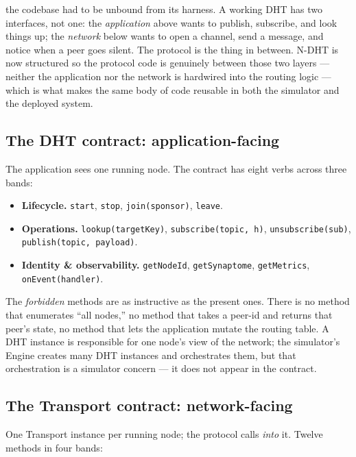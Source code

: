 \documentclass[twoside,nobib]{tufte-book}
\newcommand{\NDHT}{N-DHT\xspace}
\begin{document}
 the codebase had to
be unbound from its harness. A working DHT has two interfaces,
not one: the \emph{application} above wants to publish,
subscribe, and look things up; the \emph{network} below wants to
open a channel, send a message, and notice when a peer goes
silent. The protocol is the thing in between. \NDHT is now
structured so the protocol code is genuinely between those two
layers --- neither the application nor the network is hardwired
into the routing logic --- which is what makes the same body of
code reusable in both the simulator and the deployed system.

\subsection{The DHT contract: application-facing}

The application sees one running node. The contract has eight
verbs across three bands:

\begin{itemize}\itemsep2pt
\item \textbf{Lifecycle.} \texttt{start}, \texttt{stop},
  \texttt{join(sponsor)}, \texttt{leave}.
\item \textbf{Operations.} \texttt{lookup(targetKey)},
  \texttt{subscribe(topic, h)}, \texttt{unsubscribe(sub)},
  \texttt{publish(topic, payload)}.
\item \textbf{Identity \& observability.} \texttt{getNodeId},
  \texttt{getSynaptome}, \texttt{getMetrics},
  \texttt{onEvent(handler)}.
\end{itemize}

The \emph{forbidden} methods are as instructive as the present
ones. There is no method that enumerates ``all nodes,'' no
method that takes a peer-id and returns that peer's state, no
method that lets the application mutate the routing table. A DHT
instance is responsible for one node's view of the network; the
simulator's Engine creates many DHT instances and orchestrates
them, but that orchestration is a simulator concern --- it does
not appear in the contract.

\subsection{The Transport contract: network-facing}

One Transport instance per running node; the protocol calls
\emph{into} it. Twelve methods in four bands:
\end{document}
